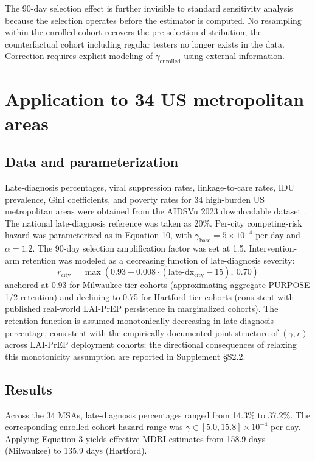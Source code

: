 \documentclass[12pt]{article}
\begin{document}
The 90-day selection effect is further invisible to standard sensitivity analysis because the selection operates before the estimator is computed. No resampling within the enrolled cohort recovers the pre-selection distribution; the counterfactual cohort including regular testers no longer exists in the data. Correction requires explicit modeling of $\gamma_{\mathrm{enrolled}}$ using external information.

\section{Application to 34 US metropolitan areas}

\subsection{Data and parameterization}

Late-diagnosis percentages, viral suppression rates, linkage-to-care rates, IDU prevalence, Gini coefficients, and poverty rates for 34 high-burden US metropolitan areas were obtained from the AIDSVu 2023 downloadable dataset \cite{aidsvu2023}. The national late-diagnosis reference was taken as 20\%. Per-city competing-risk hazard was parameterized as in Equation 10, with $\gamma_{\mathrm{base}} = 5 \times 10^{-4}$ per day \cite{cdc_hiv2023,cdc_nhbs2023,bjs2023} and $\alpha = 1.2$. The 90-day selection amplification factor was set at 1.5. Intervention-arm retention was modeled as a decreasing function of late-diagnosis severity:
\begin{equation}
r_{\mathrm{city}} = \max(0.93 - 0.008 \cdot (\text{late-dx}_{\mathrm{city}} - 15),\ 0.70)
\end{equation}
anchored at 0.93 for Milwaukee-tier cohorts (approximating aggregate PURPOSE 1/2 retention) and declining to 0.75 for Hartford-tier cohorts (consistent with published real-world LAI-PrEP persistence in marginalized cohorts). The retention function is assumed monotonically decreasing in late-diagnosis percentage, consistent with the empirically documented joint structure of $(\gamma, r)$ across LAI-PrEP deployment cohorts; the directional consequences of relaxing this monotonicity assumption are reported in Supplement \S S2.2.

\subsection{Results}

Across the 34 MSAs, late-diagnosis percentages ranged from 14.3\% to 37.2\%. The corresponding enrolled-cohort hazard range was $\gamma \in [5.0, 15.8] \times 10^{-4}$ per day. Applying Equation 3 yields effective MDRI estimates from 158.9 days (Milwaukee) to 135.9 days (Hartford).
\end{document}
